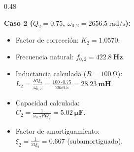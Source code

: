 \documentclass[aspectratio=169, 10pt]{beamer}
\begin{document}
\begin{frame}
\begin{columns}[t, onlytextwidth]
    \begin{column}{0.48\textwidth}
      \begin{tarjeta}[colframe=NavyDark]
        {\fontsize{9pt}{11pt}\selectfont \textbf{\color{NavyDark} Caso 2 ($Q_2 = 0.75$, $\omega_{0,2} = \qty{2656.5}{\radian\per\second}$):}}\\[2pt]
        {\fontsize{8pt}{10pt}\selectfont
        \begin{itemize}\setlength{\itemsep}{2.5pt}
          \item Factor de corrección: $K_2 = \mathbf{1.0570}$.
          \item Frecuencia natural: $f_{0,2} = \mathbf{\qty{422.8}{\hertz}}$.
          \item Inductancia calculada ($R = \qty{100}{\ohm}$):\\
          $L_2 = \frac{R Q_2}{\omega_{0,2}} = \frac{100 \cdot 0.75}{2656.5} = \mathbf{\qty{28.23}{\milli\henry}}$.
          \item Capacidad calculada:\\
          $C_2 = \frac{1}{\omega_{0,2} R Q_2} = \mathbf{\qty{5.02}{\micro\farad}}$.
          \item Factor de amortiguamiento:\\
          $\xi_2 = \frac{1}{2 Q_2} = \mathbf{0.667}$ (subamortiguado).
        \end{itemize}
        }
      \end{tarjeta}
    \end{column}
  \end{columns}
\end{frame}

\end{document}
